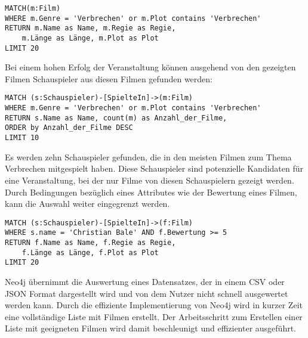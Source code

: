 \begin{Verbatim}[frame=single]
MATCH(m:Film) 
WHERE m.Genre = 'Verbrechen' or m.Plot contains 'Verbrechen'
RETURN m.Name as Name, m.Regie as Regie, 
	m.Länge as Länge, m.Plot as Plot 
LIMIT 20
\end{Verbatim}
Bei einem hohen Erfolg der Veranstaltung können ausgehend von den gezeigten Filmen Schauspieler aus diesen Filmen gefunden werden:
\begin{Verbatim}[frame=single]
MATCH (s:Schauspieler)-[SpielteIn]->(m:Film)
WHERE m.Genre = 'Verbrechen' or m.Plot contains 'Verbrechen'
RETURN s.Name as Name, count(m) as Anzahl_der_Filme,
ORDER by Anzahl_der_Filme DESC
LIMIT 10
\end{Verbatim}
Es werden zehn Schauspieler gefunden, die in den meisten Filmen zum Thema Verbrechen mitgespielt haben. Diese Schauspieler sind potenzielle Kandidaten für eine Veranstaltung, bei der nur Filme von diesen Schauspielern gezeigt werden. Durch Bedingungen bezüglich eines Attributes wie der Bewertung eines Filmen, kann die Auswahl weiter eingegrenzt werden.
\begin{Verbatim}[frame=single]
MATCH (s:Schauspieler)-[SpielteIn]->(f:Film) 
WHERE s.name = 'Christian Bale' AND f.Bewertung >= 5
RETURN f.Name as Name, f.Regie as Regie, 
	f.Länge as Länge, f.Plot as Plot 
LIMIT 20
\end{Verbatim}
Neo4j übernimmt die Auswertung eines Datensatzes, der in einem CSV oder JSON Format dargestellt wird und von dem Nutzer nicht schnell ausgewertet werden kann. Durch die effiziente Implementierung von Neo4j wird in kurzer Zeit eine vollständige Liste mit Filmen erstellt. Der Arbeitsschritt zum Erstellen einer Liste mit geeigneten Filmen wird damit beschleunigt und effizienter ausgeführt.
